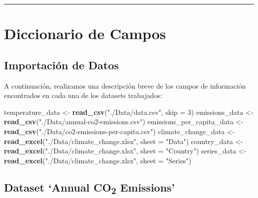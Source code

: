 \documentclass[
]{book}
\newenvironment{Shaded}{\begin{snugshade}}{\end{snugshade}}
\newcommand{\AttributeTok}[1]{\textcolor[rgb]{0.13,0.29,0.53}{#1}}
\newcommand{\DecValTok}[1]{\textcolor[rgb]{0.00,0.00,0.81}{#1}}
\newcommand{\FunctionTok}[1]{\textcolor[rgb]{0.13,0.29,0.53}{\textbf{#1}}}
\newcommand{\NormalTok}[1]{#1}
\newcommand{\OtherTok}[1]{\textcolor[rgb]{0.56,0.35,0.01}{#1}}
\newcommand{\StringTok}[1]{\textcolor[rgb]{0.31,0.60,0.02}{#1}}
\begin{document}
\begin{center}\rule{0.5\linewidth}{0.5pt}\end{center}

\chapter{Diccionario de Campos}\label{diccionario-de-campos}

\section{Importación de Datos}\label{importaciuxf3n-de-datos}

A continuación, realizamos una descripción breve de los campos de información encontrados en cada una de los datasets trabajados:

\begin{Shaded}
\begin{Highlighting}[]
\NormalTok{temperature\_data }\OtherTok{\textless{}{-}} \FunctionTok{read\_csv}\NormalTok{(}\StringTok{"./Data/data.csv"}\NormalTok{, }\AttributeTok{skip =} \DecValTok{3}\NormalTok{)}
\NormalTok{emissions\_data }\OtherTok{\textless{}{-}} \FunctionTok{read\_csv}\NormalTok{(}\StringTok{"./Data/annual{-}co2{-}emissions.csv"}\NormalTok{)}
\NormalTok{emissions\_per\_capita\_data }\OtherTok{\textless{}{-}} \FunctionTok{read\_csv}\NormalTok{(}\StringTok{"./Data/co2{-}emissions{-}per{-}capita.csv"}\NormalTok{)}
\NormalTok{climate\_change\_data }\OtherTok{\textless{}{-}} \FunctionTok{read\_excel}\NormalTok{(}\StringTok{"./Data/climate\_change.xlsx"}\NormalTok{, }\AttributeTok{sheet =} \StringTok{"Data"}\NormalTok{)}
\NormalTok{country\_data }\OtherTok{\textless{}{-}} \FunctionTok{read\_excel}\NormalTok{(}\StringTok{"./Data/climate\_change.xlsx"}\NormalTok{, }\AttributeTok{sheet =} \StringTok{"Country"}\NormalTok{)}
\NormalTok{series\_data }\OtherTok{\textless{}{-}} \FunctionTok{read\_excel}\NormalTok{(}\StringTok{"./Data/climate\_change.xlsx"}\NormalTok{, }\AttributeTok{sheet =} \StringTok{"Series"}\NormalTok{)}
\end{Highlighting}
\end{Shaded}

\section{\texorpdfstring{Dataset `Annual CO\textsubscript{2} Emissions'}{Dataset `Annual CO2 Emissions'}}\label{dataset-annual-co2-emissions}
\end{document}
